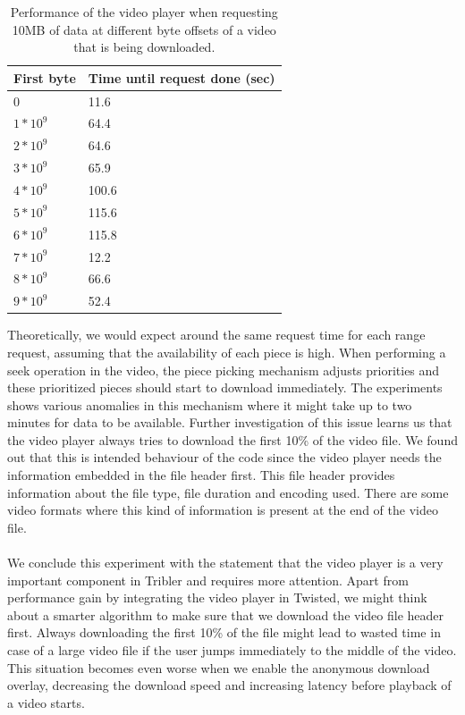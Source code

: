 \begin{table}[]
	\centering
	\begin{tabular}{|l|l|}
		\hline
		\textbf{First byte}               & \textbf{Time until request done (sec)} \\ \hline
		0                        & 11.6                  \\ \hline
		$ 1 * 10^9 $ & 64.4                  \\ \hline
		$ 2 * 10^9 $ & 64.6                  \\ \hline
		$ 3 * 10^9 $ & 65.9                   \\ \hline
		$ 4 * 10^9 $ & 100.6                   \\ \hline
		$ 5 * 10^9 $ & 115.6                   \\ \hline
		$ 6 * 10^9 $ & 115.8                  \\ \hline
		$ 7 * 10^9 $ & 12.2                  \\ \hline
		$ 8 * 10^9 $ & 66.6                   \\ \hline
		$ 9 * 10^9 $ & 52.4                   \\ \hline
	\end{tabular}
	\caption{Performance of the video player when requesting 10MB of data at different byte offsets of a video that is being downloaded.}
	\label{table:video_player_seek_times}
\end{table}

\noindent Theoretically, we would expect around the same request time for each range request, assuming that the availability of each piece is high. When performing a seek operation in the video, the piece picking mechanism adjusts priorities and these prioritized pieces should start to download immediately. The experiments shows various anomalies in this mechanism where it might take up to two minutes for data to be available. Further investigation of this issue learns us that the video player always tries to download the first 10\% of the video file. We found out that this is intended behaviour of the code since the video player needs the information embedded in the file header first. This file header provides information about the file type, file duration and encoding used. There are some video formats where this kind of information is present at the end of the video file.\\\\
We conclude this experiment with the statement that the video player is a very important component in Tribler and requires more attention. Apart from performance gain by integrating the video player in Twisted, we might think about a smarter algorithm to make sure that we download the video file header first. Always downloading the first 10\% of the file might lead to wasted time in case of a large video file if the user jumps immediately to the middle of the video. This situation becomes even worse when we enable the anonymous download overlay, decreasing the download speed and increasing latency before playback of a video starts.

